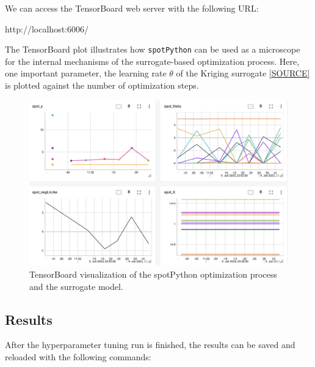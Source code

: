 \documentclass[
  letterpaper,
  DIV=11,
  numbers=noendperiod]{scrreprt}
\newenvironment{Shaded}{\begin{snugshade}}{\end{snugshade}}
\newcommand{\NormalTok}[1]{\textcolor[rgb]{0.00,0.23,0.31}{#1}}
\begin{document}
We can access the TensorBoard web server with the following URL:

\begin{Shaded}
\begin{Highlighting}[]
\NormalTok{http://localhost:6006/}
\end{Highlighting}
\end{Shaded}

The TensorBoard plot illustrates how \texttt{spotPython} can be used as
a microscope for the internal mechanisms of the surrogate-based
optimization process. Here, one important parameter, the learning rate
\(\theta\) of the Kriging surrogate
\href{https://github.com/sequential-parameter-optimization/spotPython/blob/main/src/spotPython/build/kriging.py}{{[}SOURCE{]}}
is plotted against the number of optimization steps.

\begin{figure}

{\centering \includegraphics[width=1\textwidth,height=\textheight]{figures_static/13_tensorboard_01.png}

}

\caption{TensorBoard visualization of the spotPython optimization
process and the surrogate model.}

\end{figure}

\hypertarget{results-4}{%
\subsection{Results}\label{results-4}}

After the hyperparameter tuning run is finished, the results can be
saved and reloaded with the following commands:
\end{document}
